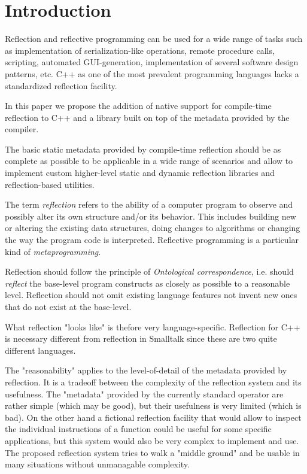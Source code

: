 \section{Introduction}
\label{section-introduction}

Reflection and reflective programming can be used
for a wide range of tasks such as implementation of serialization-like operations,
remote procedure calls, scripting, automated GUI-generation,
implementation of several software design patterns, etc.
C++ as one of the most prevalent programming languages 
lacks a standardized reflection facility.

In this paper we propose the addition of native support for
compile-time reflection to C++ and a library built
on top of the metadata provided by the compiler.

The basic static metadata provided by compile-time reflection
should be as complete as possible to be applicable in a wide
range of scenarios and allow to implement custom higher-level
static and dynamic reflection libraries and reflection-based
utilities.

The term \emph{reflection} refers to the ability of a computer program
to observe and possibly alter its own structure and/or its behavior.
This includes building new or altering the existing data structures,
doing changes to algorithms or changing the way the program code
is interpreted. Reflective programming is a particular kind
of \emph{metaprogramming}.

Reflection should follow the principle of {\em Ontological correspondence},
i.e. should {\em reflect} the base-level program constructs as closely
as possible to a reasonable level.
Reflection should not omit existing language features not invent new
ones that do not exist at the base-level.

What reflection "looks like" is thefore very language-specific.
Reflection for C++ is necessary different from reflection in Smalltalk
since these are two quite different languages.

The "reasonability" applies to the level-of-detail of the metadata
provided by reflection. It is a tradeoff between the complexity
of the reflection system and its usefulness. The "metadata" provided
by the currently standard \verb@typeid@ operator are rather simple
(which may be good), but their usefulness is very limited (which
is bad). On the other hand a fictional reflection facility that would
allow to inspect the individual instructions of a function could
be useful for some specific applications, but this system would
also be very complex to implement and use.
The proposed reflection system tries to walk a "middle ground"
and be usable in many situations without unmanagable complexity.

